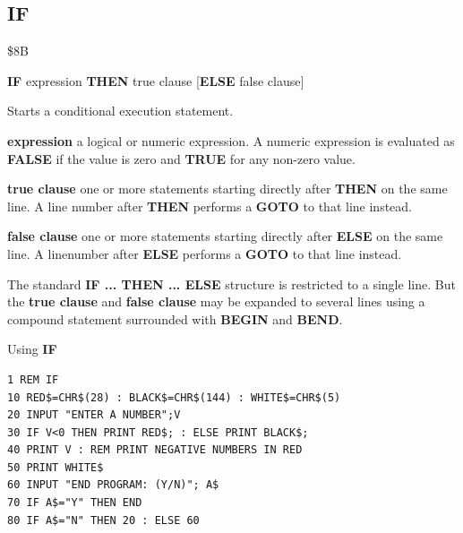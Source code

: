 \subsection{IF}
\begin{description}[leftmargin=2cm,style=nextline]
\item [Token:] \$8B
\item [Format:] {\bf IF} expression {\bf THEN} true clause
		[{\bf ELSE} false clause]
\item [Usage:] Starts a conditional execution
               statement.

                {\bf expression} a logical or numeric expression.
                A numeric expression is evaluated as {\bf FALSE}
                if the value is zero and {\bf TRUE} for any non-zero
                value.

                {\bf true clause} one or more statements starting
                directly after {\bf THEN} on the same line.
                A line number after {\bf THEN} performs a
                {\bf GOTO} to that line instead.

                {\bf false clause} one or more statements starting
                directly after {\bf ELSE} on the same line.
                A linenumber after {\bf ELSE} performs a
                {\bf GOTO} to that line instead.

\item [Remarks:]
               The standard {\bf IF ... THEN ... ELSE} structure
               is restricted to a single line. But the {\bf true clause}
               and {\bf false clause} may be expanded to several lines
               using a compound statement surrounded with
               {\bf BEGIN} and {\bf BEND}.
\item [Example:]
                Using {\bf IF}
\begin{tcolorbox}[colback=black,coltext=white]
\verbatimfont{\codefont}
\begin{verbatim}
1 REM IF
10 RED$=CHR$(28) : BLACK$=CHR$(144) : WHITE$=CHR$(5)
20 INPUT "ENTER A NUMBER";V
30 IF V<0 THEN PRINT RED$; : ELSE PRINT BLACK$;
40 PRINT V : REM PRINT NEGATIVE NUMBERS IN RED
50 PRINT WHITE$
60 INPUT "END PROGRAM: (Y/N)"; A$
70 IF A$="Y" THEN END
80 IF A$="N" THEN 20 : ELSE 60
\end{verbatim}
\end{tcolorbox}
\end{description}


